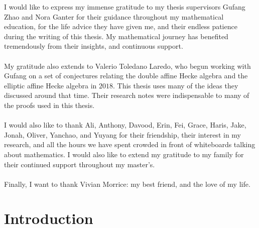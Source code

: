 \documentclass[a4paper]{report}
\theoremstyle{theorem}
\theoremstyle{definition}
\theoremstyle{remark}
\theoremstyle{proposition}
\theoremstyle{conjecture}
\theoremstyle{lemma}
\theoremstyle{corollary}
\theoremstyle{exercise}
\theoremstyle{example}
\begin{document}
  I would like to express my immense gratitude to my thesis supervisors Gufang Zhao and Nora Ganter for their guidance 
  throughout my mathematical education, for the life advice they have given me, and their endless patience during the writing 
  of this thesis. My mathematical journey has benefited tremendously from their insights, and continuous support.\\\\
  My gratitude also extends to Valerio Toledano Laredo, who begun working with Gufang on a set of conjectures relating the 
  double affine Hecke algebra and the elliptic affine Hecke algebra in $2018$. 
  This thesis uses many of the ideas they discussed around that time. Their research notes were indispensable to many of the proofs 
  used in this thesis.\\\\
  I would also like to thank 
  Ali, Anthony, Davood, Erin, Fei, Grace, Haris, Jake, Jonah, Oliver, Yanchao, and Yuyang
  for their friendship, their interest in my research,
  and all the hours we have spent crowded in front of whiteboards talking about mathematics.
  I would also like to extend my gratitude to my family for their continued support throughout my master's.\\\\ 
  Finally, I want to thank Vivian Morrice: my best friend, and the love of my life. 
  
  \tableofcontents
  
  
  \chapter*{Introduction}
  
\end{document}

